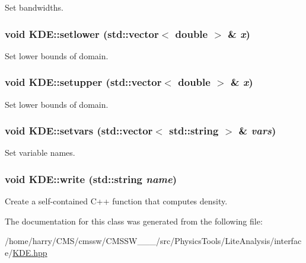 Set bandwidths. 

\hypertarget{classKDE_a18}{
\subsubsection[setlower]{\setlength{\rightskip}{0pt plus 5cm}void KDE::setlower (std::vector$<$ double $>$ \& {\em x})}}
\label{classKDE_a18}


Set lower bounds of domain. 

\hypertarget{classKDE_a19}{
\subsubsection[setupper]{\setlength{\rightskip}{0pt plus 5cm}void KDE::setupper (std::vector$<$ double $>$ \& {\em x})}}
\label{classKDE_a19}


Set lower bounds of domain. 

\hypertarget{classKDE_a17}{
\subsubsection[setvars]{\setlength{\rightskip}{0pt plus 5cm}void KDE::setvars (std::vector$<$ std::string $>$ \& {\em vars})}}
\label{classKDE_a17}


Set variable names. 

\hypertarget{classKDE_a16}{
\subsubsection[write]{\setlength{\rightskip}{0pt plus 5cm}void KDE::write (std::string {\em name})}}
\label{classKDE_a16}


Create a self-contained C++ function that computes density. 



The documentation for this class was generated from the following file:\begin{CompactItemize}
\item 
/home/harry/CMS/cmssw/CMSSW\_\_\_/src/Physics\-Tools/Lite\-Analysis/interface/\hyperlink{KDE_8hpp}{KDE.hpp}\end{CompactItemize}

